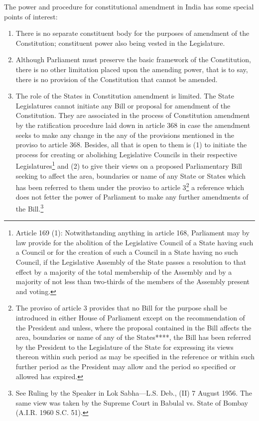 \begin{multicols}{2}
\vspace{-.1cm}

\noi
The power and procedure for constitutional amendment in India has some special points of
interest:

\vspace{-.3cm}

\begin{enumerate}
\itemsep=0pt
\item There is no separate constituent body for the purposes of amendment of the Constitution;
constituent power also being vested in the Legislature.

\item Although Parliament must preserve the basic framework of the Constitution, there is no
other limitation placed upon the amending power, that is to say, there is no provision of the
Constitution that cannot be amended.

\item The role of the States in Constitution amendment is limited. The State Legislatures cannot
initiate any Bill or proposal for amendment of the Constitution. They are associated in the
process of Constitution amendment by the ratification procedure laid down in article 368 in
case the amendment seeks to make any change in the any of the provisions mentioned in the
proviso to article 368. Besides, all that is open to them is (1) to initiate the process for creating
or abolishing Legislative Councils in their respective Legislatures\footnote{Article 169 (1): Notwithstanding anything in article 168, Parliament may by law provide for the abolition of the Legislative Council of a State having such a Council or for the creation of such a Council in a State having no such Council, if the Legislative Assembly of the State passes a resolution to that effect by a majority of the total membership of the Assembly and by a majority of not less than two-thirds of the members of the Assembly present and voting.} and (2) to give their views
on a proposed Parliamentary Bill seeking to affect the area, boundaries or name of any State
or States which has been referred to them under the proviso to article 3\footnote{The proviso of article 3 provides that no Bill for the purpose shall be introduced in either House of Parliament
except on the recommendation of the President and unless, where the proposal contained in the Bill affects the
area, boundaries or name of any of the States****, the Bill has been referred by the President to the Legislature
of the State for expressing its views thereon within such period as may be specified in the reference or within such
further period as the President may allow and the period so specified or allowed has expired.} a reference which
does not fetter the power of Parliament to make any further amendments of the Bill.\footnote{See Ruling by the Speaker in Lok Sabha—L.S. Deb., (II) 7 August 1956. The same view was taken by the Supreme Court in Babulal vs. State of Bombay (A.I.R. 1960 S.C. 51).}
\end{enumerate}


\end{multicols}
